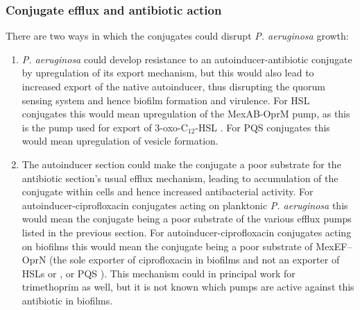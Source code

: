 \subsubsection{Conjugate efflux and antibiotic action\label{sec:conj_eff}}

There are two ways in which the conjugates could disrupt \textit{P. aeruginosa} growth:

\begin{enumerate}

\item \textit{P. aeruginosa} could develop resistance to an autoinducer-antibiotic conjugate by upregulation of its export mechanism, but this would also lead to increased export of the native autoinducer, thus disrupting the quorum sensing system and hence biofilm formation and virulence\cite{Dubern2008,Davies1998,Evans1998}.
For HSL conjugates this would mean upregulation of the MexAB-OprM pump, as this is the pump used for export of 3-oxo-C$_{12}$-HSL \cite{Evans1998,Poole2004}.
For PQS conjugates this would mean upregulation of vesicle formation\cite{Florez2017}.

\item The autoinducer section could make the conjugate a poor substrate for the antibiotic section's usual efflux mechanism, leading to accumulation of the conjugate within cells and hence increased antibacterial activity. 
For autoinducer-ciprofloxacin conjugates acting on planktonic \textit{P. aeruginosa} this would mean the conjugate being a poor substrate of the various efflux pumps listed in the previous section.
For autoinducer-ciprofloxacin conjugates acting on biofilms this would mean the conjugate being a poor substrate of MexEF–OprN (the sole exporter of ciprofloxacin  in biofilms\cite{DeKievit2001} and not an exporter of HSLs  or , or PQS \cite{Poole2004}).
This mechanism could in principal work for trimethoprim  as well, but it is not known which pumps are active against this antibiotic in biofilms. 

\end{enumerate}









